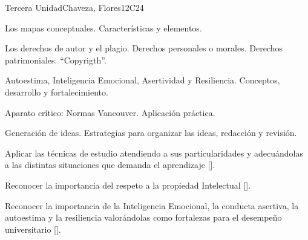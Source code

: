 \begin{syllabus}
\begin{unit}{}{Tercera Unidad}{Chaveza, Flores}{12}{C24}
\begin{topics}
        \item Los mapas conceptuales. Características y elementos.
        \item Los derechos de autor y el plagio. Derechos personales o morales. Derechos patrimoniales. ``Copyrigth''.
        \item Autoestima, Inteligencia Emocional, Asertividad y Resiliencia. Conceptos, desarrollo y fortalecimiento.
        \item Aparato crítico: Normas Vancouver. Aplicación práctica.
        \item Generación de ideas. Estrategias para organizar las ideas, redacción y revisión.
\end{topics}
\begin{learningoutcomes}
        \item Aplicar las técnicas de estudio atendiendo a sus particularidades y adecuándolas a las distintas situaciones que demanda el aprendizaje [\Usage].
        \item Reconocer la importancia del respeto a la propiedad Intelectual [\Usage].
        \item Reconocer la importancia de la Inteligencia Emocional, la conducta asertiva, la autoestima y la resiliencia valorándolas como fortalezas para el desempeño universitario [\Usage].
\end{learningoutcomes}
\end{unit}


\end{syllabus}
